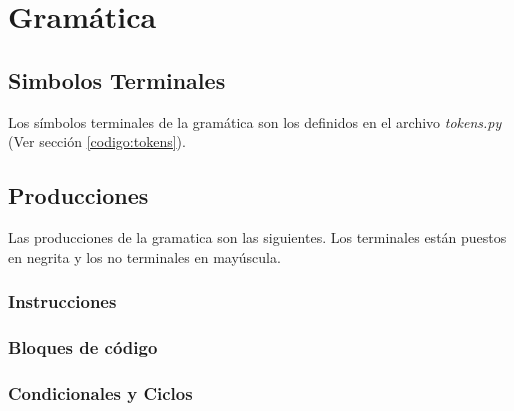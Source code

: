 \section{Gramática}
\label{sec:gramatica}

\subsection{Simbolos Terminales}
	Los símbolos terminales de la gramática son los definidos en el archivo 
	\textit{tokens.py} (Ver sección \ref{codigo:tokens}).

\subsection{Producciones}
	Las producciones de la gramatica son las siguientes. Los terminales
	están puestos en negrita y los no terminales en mayúscula.
\newToken{\SEMICOLON}{;}
\newToken{\LPARENT}{(}
\newToken{\RPARENT}{)}
\newToken{\LBRACKET}{[}
\newToken{\RBRACKET}{]}
\newToken{\LBRACE}{\{}
\newToken{\RBRACE}{\}}
\newToken{\ADD}{+}
\newToken{\MULT}{*}
\newToken{\COMMA}{,}
\newToken{\SUB}{-}
\newToken{\DIV}{/}
\newToken{\COLON}{:}

\subsubsection{Instrucciones}
\begin{reglas}
\end{reglas}
\subsubsection{Bloques de código}
\begin{reglas}
\end{reglas}
\subsubsection{Condicionales y Ciclos}
\begin{reglas}
	\\
\end{reglas}
